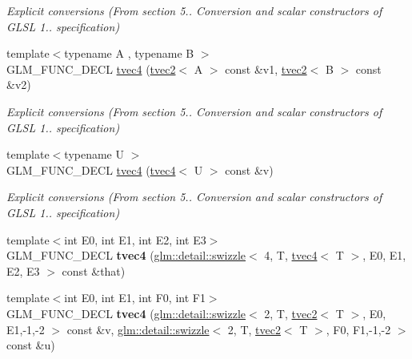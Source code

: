 \begin{DoxyCompactItemize}
\begin{DoxyCompactList}\small\item\em Explicit conversions (From section 5.. Conversion and scalar constructors of G\-L\-S\-L 1.. specification) \end{DoxyCompactList}\item 
\hypertarget{structglm_1_1detail_1_1tvec4_a286ff5e27147379cd4ba828e94715686}{{\footnotesize template$<$typename A , typename B $>$ }\\G\-L\-M\-\_\-\-F\-U\-N\-C\-\_\-\-D\-E\-C\-L \hyperlink{structglm_1_1detail_1_1tvec4_a286ff5e27147379cd4ba828e94715686}{tvec4} (\hyperlink{structglm_1_1detail_1_1tvec2}{tvec2}$<$ A $>$ const \&v1, \hyperlink{structglm_1_1detail_1_1tvec2}{tvec2}$<$ B $>$ const \&v2)}\label{structglm_1_1detail_1_1tvec4_a286ff5e27147379cd4ba828e94715686}

\begin{DoxyCompactList}\small\item\em Explicit conversions (From section 5.. Conversion and scalar constructors of G\-L\-S\-L 1.. specification) \end{DoxyCompactList}\item 
\hypertarget{structglm_1_1detail_1_1tvec4_aebce6283ba41010596bb01c785d43d97}{{\footnotesize template$<$typename U $>$ }\\G\-L\-M\-\_\-\-F\-U\-N\-C\-\_\-\-D\-E\-C\-L \hyperlink{structglm_1_1detail_1_1tvec4_aebce6283ba41010596bb01c785d43d97}{tvec4} (\hyperlink{structglm_1_1detail_1_1tvec4}{tvec4}$<$ U $>$ const \&v)}\label{structglm_1_1detail_1_1tvec4_aebce6283ba41010596bb01c785d43d97}

\begin{DoxyCompactList}\small\item\em Explicit conversions (From section 5.. Conversion and scalar constructors of G\-L\-S\-L 1.. specification) \end{DoxyCompactList}\item 
\hypertarget{structglm_1_1detail_1_1tvec4_ab6f537fb6207aaefb6dc098ad4b78e93}{{\footnotesize template$<$int E0, int E1, int E2, int E3$>$ }\\G\-L\-M\-\_\-\-F\-U\-N\-C\-\_\-\-D\-E\-C\-L {\bfseries tvec4} (\hyperlink{structglm_1_1detail_1_1swizzle}{glm\-::detail\-::swizzle}$<$ 4, T, \hyperlink{structglm_1_1detail_1_1tvec4}{tvec4}$<$ T $>$, E0, E1, E2, E3 $>$ const \&that)}\label{structglm_1_1detail_1_1tvec4_ab6f537fb6207aaefb6dc098ad4b78e93}

\item 
\hypertarget{structglm_1_1detail_1_1tvec4_adee18e0982dfe0d8fdf78ff81c25aae6}{{\footnotesize template$<$int E0, int E1, int F0, int F1$>$ }\\G\-L\-M\-\_\-\-F\-U\-N\-C\-\_\-\-D\-E\-C\-L {\bfseries tvec4} (\hyperlink{structglm_1_1detail_1_1swizzle}{glm\-::detail\-::swizzle}$<$ 2, T, \hyperlink{structglm_1_1detail_1_1tvec2}{tvec2}$<$ T $>$, E0, E1,-\/1,-\/2 $>$ const \&v, \hyperlink{structglm_1_1detail_1_1swizzle}{glm\-::detail\-::swizzle}$<$ 2, T, \hyperlink{structglm_1_1detail_1_1tvec2}{tvec2}$<$ T $>$, F0, F1,-\/1,-\/2 $>$ const \&u)}\label{structglm_1_1detail_1_1tvec4_adee18e0982dfe0d8fdf78ff81c25aae6}


\end{DoxyCompactItemize}
